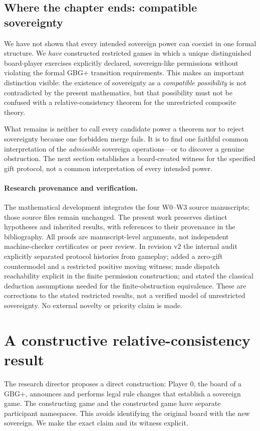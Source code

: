 \documentclass[11pt,letterpaper]{article}
\theoremstyle{definition}\newtheorem{definition}[theorem]{Definition}\newtheorem{example}[theorem]{Example}
\theoremstyle{remark}\newtheorem{remark}[theorem]{Remark}
\begin{document}
\subsection{Where the chapter ends: compatible sovereignty}
We have not shown that every intended sovereign power can coexist in one
formal structure.  We \emph{have} constructed restricted games in which a
unique distinguished board-player exercises explicitly declared,
sovereign-like permissions without violating the formal GBG+ transition
requirements.  This makes an important distinction visible: the existence
of sovereignty as a \emph{compatible possibility} is not contradicted by
the present mathematics, but that possibility must not be confused with a
relative-consistency theorem for the unrestricted composite theory.

What remains is neither to call every candidate power a theorem nor to
reject sovereignty because one forbidden merge fails.  It is to find one
faithful common interpretation of the \emph{admissible} sovereign
operations---or to discover a genuine obstruction.  The next section establishes a board-created witness for the specified gift protocol, not a common interpretation of every intended power.

\paragraph{Research provenance and verification.}
The mathematical development integrates the four W0--W3 source manuscripts;
those source files remain unchanged. The present work preserves distinct
hypotheses and inherited results, with references to their provenance in the
bibliography. All proofs are manuscript-level arguments, not independent
machine-checker certificates or peer review. In revision v2 the internal audit
explicitly separated protocol histories from gameplay; added a zero-gift
countermodel and a restricted positive moving witness; made dispatch reachability
explicit in the finite permission construction; and stated the classical
deduction assumptions needed for the finite-obstruction equivalence. These
are corrections to the stated restricted results, not a verified model of
unrestricted sovereignty. No external novelty or priority claim is made.



\section{A constructive relative-consistency result}\label{sec:board-created}
The research director proposes a direct construction: Player 0, the board of a GBG+, announces and performs legal rule changes that establish a sovereign game. The constructing game and the constructed game have separate participant namespaces. This avoids identifying the original board with the new sovereign. We make the exact claim and its witness explicit.
\end{document}
